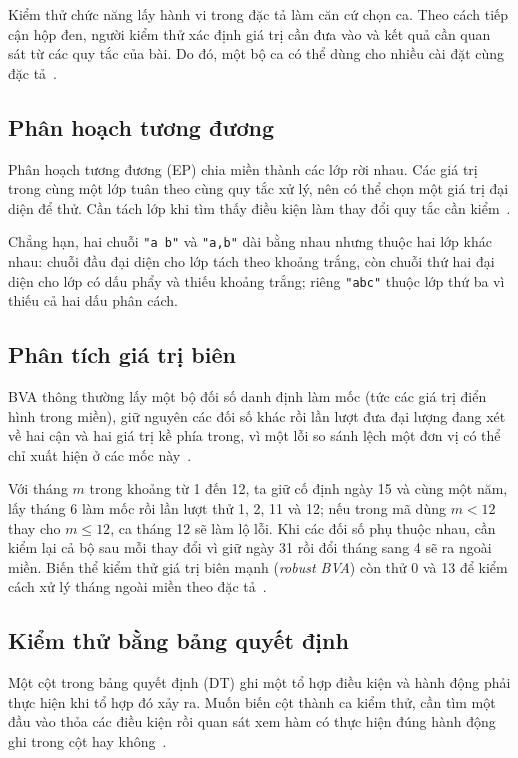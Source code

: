 Kiểm thử chức năng lấy hành vi trong đặc tả làm căn cứ chọn ca. Theo cách tiếp cận hộp đen, người kiểm thử xác định giá trị cần đưa vào và kết quả cần quan sát từ các quy tắc của bài. Do đó, một bộ ca có thể dùng cho nhiều cài đặt cùng đặc tả~\cite[tr.~12--14]{pham2014kiemthu}.

\subsection{Phân hoạch tương đương}

Phân hoạch tương đương (EP) chia miền thành các lớp rời nhau. Các giá trị trong cùng một lớp tuân theo cùng quy tắc xử lý, nên có thể chọn một giá trị đại diện để thử. Cần tách lớp khi tìm thấy điều kiện làm thay đổi quy tắc cần kiểm~\cite[tr.~131--133]{pham2014kiemthu}.

Chẳng hạn, hai chuỗi \texttt{"a b"} và \texttt{"a,b"} dài bằng nhau nhưng thuộc hai lớp khác nhau: chuỗi đầu đại diện cho lớp tách theo khoảng trắng, còn chuỗi thứ hai đại diện cho lớp có dấu phẩy và thiếu khoảng trắng; riêng \texttt{"abc"} thuộc lớp thứ ba vì thiếu cả hai dấu phân cách.

\subsection{Phân tích giá trị biên}

BVA thông thường lấy một bộ đối số danh định làm mốc (tức các giá trị điển hình trong miền), giữ nguyên các đối số khác rồi lần lượt đưa đại lượng đang xét về hai cận và hai giá trị kề phía trong, vì một lỗi so sánh lệch một đơn vị có thể chỉ xuất hiện ở các mốc này~\cite[tr.~122--126]{pham2014kiemthu}.

Với tháng \(m\) trong khoảng từ 1 đến 12, ta giữ cố định ngày 15 và cùng một năm, lấy tháng 6 làm mốc rồi lần lượt thử 1, 2, 11 và 12; nếu trong mã dùng \(m < 12\) thay cho \(m \le 12\), ca tháng 12 sẽ làm lộ lỗi. Khi các đối số phụ thuộc nhau, cần kiểm lại cả bộ sau mỗi thay đổi vì giữ ngày 31 rồi đổi tháng sang 4 sẽ ra ngoài miền. Biến thể kiểm thử giá trị biên mạnh (\textit{robust BVA}) còn thử 0 và 13 để kiểm cách xử lý tháng ngoài miền theo đặc tả~\cite[tr.~123--126]{pham2014kiemthu}.

\subsection{Kiểm thử bằng bảng quyết định}

Một cột trong bảng quyết định (DT) ghi một tổ hợp điều kiện và hành động phải thực hiện khi tổ hợp đó xảy ra. Muốn biến cột thành ca kiểm thử, cần tìm một đầu vào thỏa các điều kiện rồi quan sát xem hàm có thực hiện đúng hành động ghi trong cột hay không~\cite[tr.~141--144]{pham2014kiemthu}.

